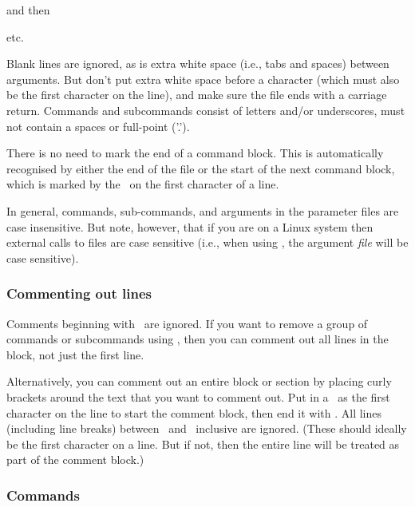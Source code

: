 and then
\begin{description}
\item {}
\item {}
\item etc.
\end{description}

Blank lines are ignored, as is extra white space (i.e., tabs and spaces) between arguments. But don't put extra white space before a \command{} character (which must also be the first character on the line), and make sure the file ends with a carriage return. Commands and subcommands consist of letters and/or underscores, must not contain a spaces or full-point ('.').

There is no need to mark the end of a command block. This is automatically recognised by either the end of the file or the start of the next command block, which is marked by the \command{}\ on the first character of a line.

In general, commands, sub-commands, and arguments in the parameter files are case insensitive. But note, however, that if you are on a Linux system then external calls to files are case sensitive (i.e., when using , the argument \emph{file} will be case sensitive). 

\subsubsection{Commenting out lines}

Comments beginning with \commentline\ are ignored. If you want to remove a group of commands or subcommands using \commentline, then you can comment out all lines in the block, not just the first line. 

Alternatively, you can comment out an entire block or section by placing curly brackets around the text that you want to comment out. Put in a \commentstart\ as the first character on the line to start the comment block, then end it with \commentend. All lines (including line breaks) between \commentstart\ and \commentend\ inclusive are ignored. (These should ideally be the first character on a line. But if not, then the entire line will be treated as part of the comment block.)

\subsubsection{Commands}

